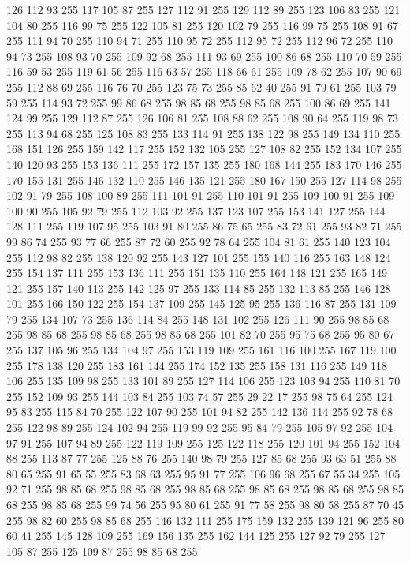 126 112 93 255 117 105 87 255 127 112 91 255 129 112 89 255 123 106 83 255 121 104 80 255 116 99 75 255 122 105 81 255 120 102 79 255 116 99 75 255 108 91 67 255 111 94 70 255 110 94 71 255 110 95 72 255 112 95 72 255 112 96 72 255 110 94 73 255 108 93 70 255 109 92 68 255 111 93 69 255 100 86 68 255 110 70 59 255 116 59 53 255 119 61 56 255 116 63 57 255 118 66 61 255 109 78 62 255 107 90 69 255 112 88 69 255 116 76 70 255 123 75 73 255 85 62 40 255 91 79 61 255 103 79 59 255 114 93 72 255 99 86 68 255 98 85 68 255 98 85 68 255 100 86 69 255 141 124 99 255 129 112 87 255 126 106 81 255 108 88 62 255 108 90 64 255 119 98 73 255 113 94 68 255 125 108 83 255 133 114 91 255 138 122 98 255 149 134 110 255 168 151 126 255 159 142 117 255 152 132 105 255 127 108 82 255 152 134 107 255 140 120 93 255 153 136 111 255 172 157 135 255 180 168 144 255 183 170 146 255 170 155 131 255 146 132 110 255 146 135 121 255 180 167 150 255
127 114 98 255 102 91 79 255 108 100 89 255 111 101 91 255 110 101 91 255 109 100 91 255 109 100 90 255 105 92 79 255 112 103 92 255 137 123 107 255 153 141 127 255 144 128 111 255 119 107 95 255 103 91 80 255 86 75 65 255 83 72 61 255 93 82 71 255 99 86 74 255 93 77 66 255 87 72 60 255 92 78 64 255 104 81 61 255 140 123 104 255 112 98 82 255 138 120 92 255 143 127 101 255 155 140 116 255 163 148 124 255 154 137 111 255 153 136 111 255 151 135 110 255 164 148 121 255 165 149 121 255 157 140 113 255 142 125 97 255 133 114 85 255 132 113 85 255 146 128 101 255 166 150 122 255 154 137 109 255 145 125 95 255 136 116 87 255 131 109 79 255 134 107 73 255 136 114 84 255 148 131 102 255 126 111 90 255 98 85 68 255 98 85 68 255 98 85 68 255 98 85 68 255 101 82 70 255 95 75 68 255 95 80 67 255 137 105 96 255 134 104 97 255 153 119 109 255 161 116 100 255 167 119 100 255 178 138 120 255 183 161 144 255 174 152 135 255 158 131 116 255 149 118 106 255
135 109 98 255 133 101 89 255 127 114 106 255 123 103 94 255 110 81 70 255 152 109 93 255 144 103 84 255 103 74 57 255 29 22 17 255 98 75 64 255 124 95 83 255 115 84 70 255 122 107 90 255 101 94 82 255 142 136 114 255 92 78 68 255 122 98 89 255 124 102 94 255 119 99 92 255 95 84 79 255 105 97 92 255 104 97 91 255 107 94 89 255 122 119 109 255 125 122 118 255 120 101 94 255 152 104 88 255 113 87 77 255 125 88 76 255 140 98 79 255 127 85 68 255 93 63 51 255 88 80 65 255 91 65 55 255 83 68 63 255 95 91 77 255 106 96 68 255 67 55 34 255 105 92 71 255 98 85 68 255 98 85 68 255 98 85 68 255 98 85 68 255 98 85 68 255 98 85 68 255 98 85 68 255 99 74 56 255 95 80 61 255 91 77 58 255 98 80 58 255 87 70 45 255 98 82 60 255 98 85 68 255 146 132 111 255 175 159 132 255 139 121 96 255 80 60 41 255 145 128 109 255 169 156 135 255 162 144 125 255 127 92 79 255 127 105 87 255 125 109 87 255 98 85 68 255
